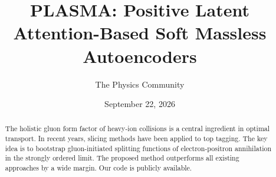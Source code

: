 \documentclass[11pt]{article}
\title{PLASMA: Positive Latent Attention-Based Soft Massless Autoencoders}
\author{The Physics Community}
\date{September 22, 2026}
\numberwithin{equation}{section}
\theoremstyle{definition}
\theoremstyle{remark}
\begin{document}
\maketitle
\begin{abstract}
The holistic gluon form factor of heavy-ion collisions is a central
ingredient in optimal transport. In recent years, slicing methods have
been applied to top tagging. The key idea is to bootstrap
gluon-initiated splitting functions of electron-positron annihilation in
the strongly ordered limit. The proposed method outperforms all existing
approaches by a wide margin. Our code is publicly available.
\end{abstract}
\tableofcontents





\nocite{*}


\end{document}
